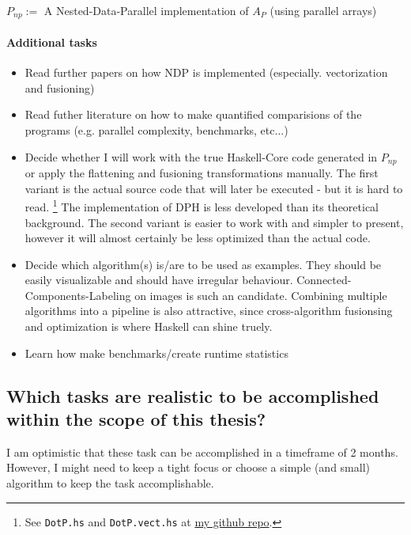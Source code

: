 \documentclass{article}
\newcommand{\ndp}[0]{$P_{np}$}
\newcommand{\note}[1]{{\tiny (#1)}}
\begin{document}
\begin{itemize}
        \ndp $:=$ A Nested-Data-Parallel implementation of $A_{P}$ \note{using parallel arrays}

    \paragraph{Additional tasks}
        \begin{itemize}
            \item Read further papers on how NDP is implemented (especially. vectorization and fusioning)
            \item Read futher literature on how to make quantified comparisions of the programs (e.g. parallel complexity, benchmarks, etc...)
            \item Decide whether I will work with the true Haskell-Core code generated in \ndp or apply the flattening and fusioning transformations manually.
                The first variant is the actual source code that will later be executed - but it is hard to read. \footnote[1]{See \texttt{DotP.hs} and \texttt{DotP.vect.hs} at \href{https://github.com/GollyTicker/Nested-Data-Parallel-Haskell/tree/0e8d3df0d8084a01b007b27debda2b64247a254d}{my github repo}. }
                The implementation of DPH is less developed than its theoretical background.
                The second variant is easier to work with and simpler to present, however it will almost certainly be less optimized than the actual code.
            \item Decide which algorithm(s) is/are to be used as examples. They should be easily visualizable and should have irregular behaviour.
                Connected-Components-Labeling on images is such an candidate. Combining multiple algorithms into
                a pipeline is also attractive, since cross-algorithm fusionsing and optimization is where Haskell can shine truely.
            \item Learn how make benchmarks/create runtime statistics
        \end{itemize}

    \subsection{Which tasks are realistic to be accomplished within the scope of this thesis?}
    I am optimistic that these task can be accomplished in a timeframe of 2 months. However, I might need to keep a tight focus or
    choose a simple (and small) algorithm to keep the task accomplishable.


\end{itemize}
\end{document}
